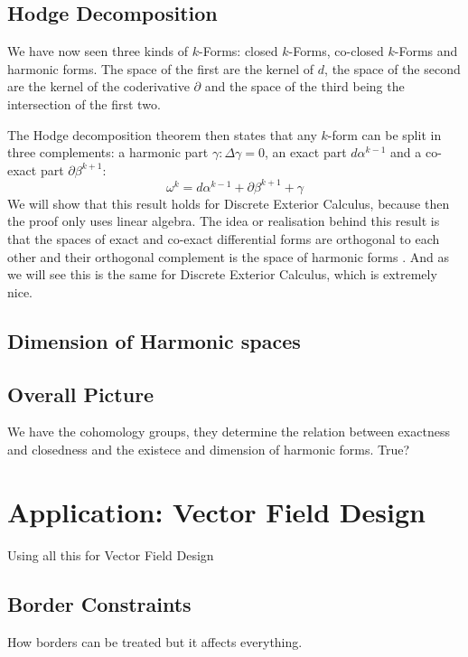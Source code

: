 \subsection{Hodge Decomposition}
We have now seen three kinds of $k$-Forms: closed $k$-Forms, co-closed $k$-Forms and harmonic forms. The space of the first are the kernel of $d$, the space of the second are the kernel of the coderivative $\partial$ and the space of the third being the intersection of the first two.

The Hodge decomposition theorem then states that any $k$-form can be split in three complements: a harmonic part $\gamma: \Delta \gamma = 0$, an exact part $d\alpha^{k-1}$ and a co-exact part $\partial \beta^{k+1}$:
\[\omega^k = d\alpha^{k-1} + \partial \beta^{k+1} + \gamma\]
We will show that this result holds for Discrete Exterior Calculus, because then the proof only uses linear algebra. The idea or realisation behind this result is that the spaces of exact and co-exact differential forms are orthogonal to each other and their orthogonal complement is the space of harmonic forms . And as we will see this is the same for Discrete Exterior Calculus, which is extremely nice.

\subsection{Dimension of Harmonic spaces}

\subsection{Overall Picture}
We have the cohomology groups, they determine the relation between exactness and closedness and the existece and dimension of harmonic forms. True?

\section{Application: Vector Field Design}
Using all this for Vector Field Design
\subsection{Border Constraints}
How borders can be treated but it affects everything.